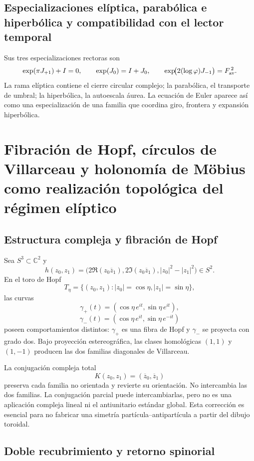 \subsection{Especializaciones elíptica, parabólica e hiperbólica y compatibilidad con el lector temporal}

Sus tres especializaciones rectoras son
\begin{equation}\label{p12-83-c11-s1:eq:constantes-euler-tres-ramas}
 \exp(\pi J_{+1})+I=0,\qquad
 \exp(J_0)=I+J_0,\qquad
 \exp\!\bigl(2(\log\varphi)J_{-1}\bigr)=F_{\rm av}^{\,2}.
\end{equation}
La rama elíptica contiene el cierre circular complejo; la parabólica, el
transporte de umbral; la hiperbólica, la autoescala áurea. La ecuación de
Euler aparece así como una especialización de una familia que coordina giro,
frontera y expansión hiperbólica.


\section{Fibración de Hopf, círculos de Villarceau y holonomía de Möbius como realización topológica del régimen elíptico}

\subsection{Estructura compleja y fibración de Hopf}

Sea \(S^3\subset\mathbb C^2\) y
\[
h(z_0,z_1)=
\bigl(2\Re(z_0\overline z_1),
2\Im(z_0\overline z_1),|z_0|^2-|z_1|^2\bigr)
\in S^2.
\]
En el toro de Hopf
\[
T_\eta=\{(z_0,z_1):|z_0|=\cos\eta,
|z_1|=\sin\eta\},
\]
las curvas
\[
\gamma_+(t)=(\cos\eta\,e^{it},\sin\eta\,e^{it}),
\]
\[
\gamma_-(t)=(\cos\eta\,e^{it},\sin\eta\,e^{-it})
\]
poseen comportamientos distintos: \(\gamma_+\) es una fibra de Hopf y
\(\gamma_-\) se proyecta con grado dos. Bajo proyección estereográfica, las
clases homológicas \((1,1)\) y \((1,-1)\) producen las dos familias diagonales
de Villarceau.

La conjugación compleja total
\[
K(z_0,z_1)=(\overline z_0,\overline z_1)
\]
preserva cada familia no orientada y revierte su orientación. No intercambia
las dos familias. La conjugación parcial puede intercambiarlas, pero no es una
aplicación compleja lineal ni el antiunitario estándar global. Esta corrección
es esencial para no fabricar una simetría partícula--antipartícula a partir del
dibujo toroidal.

\subsection{Doble recubrimiento y retorno spinorial}

